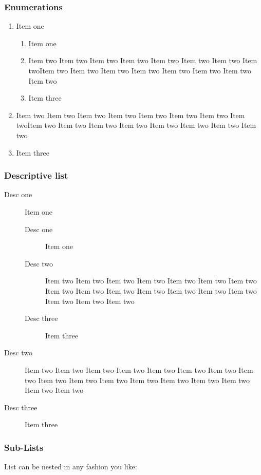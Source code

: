 \subsubsection{Enumerations}

\begin{enumerate}
  \item Item one
  \begin{enumerate}
    \item Item one
    \item Item two Item two Item two Item two Item two Item two Item
two Item twoItem two Item two Item two Item two Item two Item two Item
two Item two
    \item Item three
  \end{enumerate}
  \item Item two Item two Item two Item two Item two Item two Item two
Item twoItem two Item two Item two Item two Item two Item two Item two
Item two
  \item Item three
\end{enumerate}

\subsubsection{Descriptive list}

\begin{description}
  \item[Desc one] Item one
  \begin{description}
    \item[Desc one] Item one
    \item[Desc two] Item two Item two Item two Item two Item two Item
two Item two Item two Item two Item two Item two Item two Item two
Item two Item two Item two Item two
    \item[Desc three] Item three
  \end{description}
  \item[Desc two] Item two Item two Item two Item two Item two Item
two Item two Item two Item two Item two Item two Item two Item two
Item two Item two Item two Item two
  \item[Desc three] Item three
\end{description}

\subsubsection{Sub-Lists}

List can be nested in any fashion you like:

